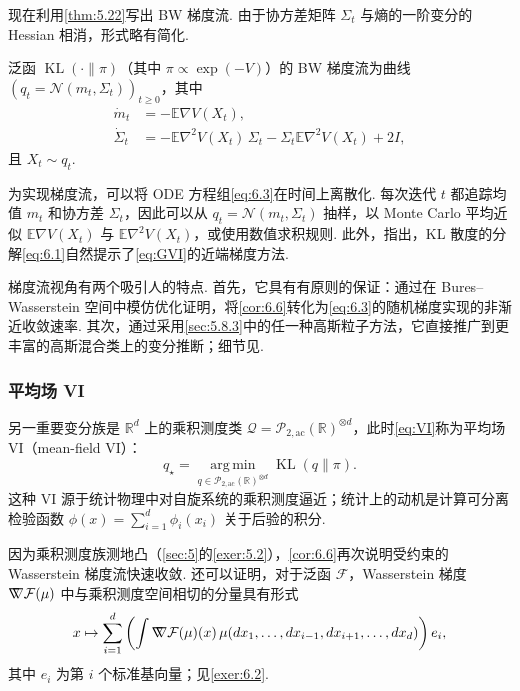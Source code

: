 现在利用\autoref{thm:5.22}写出 BW 梯度流. 由于协方差矩阵 $\Sigma_t$ 与熵的一阶变分的 Hessian 相消，形式略有简化.

\begin{theorem}\label{thm:6.8}
泛函 $\operatorname{KL}(\cdot\|\pi)$（其中 $\pi\propto\exp(-V)$）的 BW 梯度流为曲线 $(q_t=\mathcal N(m_t,\Sigma_t))_{t\geq0}$，其中
\begin{equation}\label{eq:6.3}
\begin{aligned}
\dot m_t&=-\mathbb E\nabla V(X_t),\\
\dot\Sigma_t&=-\mathbb E\nabla^2V(X_t)\,\Sigma_t
-\Sigma_t\mathbb E\nabla^2V(X_t)+2I,
\end{aligned}
\end{equation}
且 $X_t\sim q_t$.
\end{theorem}

为实现梯度流，可以将 ODE 方程组\eqref{eq:6.3}在时间上离散化. 每次迭代 $t$ 都追踪均值 $m_t$ 和协方差 $\Sigma_t$，因此可以从 $q_t=\mathcal N(m_t,\Sigma_t)$ 抽样，以 Monte Carlo 平均近似 $\mathbb E\nabla V(X_t)$ 与 $\mathbb E\nabla^2V(X_t)$，或使用数值求积规则. 此外，\cite{ref110}指出，KL 散度的分解\eqref{eq:6.1}自然提示了\eqref{eq:GVI}的近端梯度方法.

梯度流视角有两个吸引人的特点. 首先，它具有有原则的保证：通过在 Bures--Wasserstein 空间中模仿优化证明，\cite{ref110,ref192}将\autoref{cor:6.6}转化为\eqref{eq:6.3}的随机梯度实现的非渐近收敛速率. 其次，通过采用\autoref{sec:5.8.3}中的任一种高斯粒子方法，它直接推广到更丰富的高斯混合类上的变分推断；细节见\cite{ref192}.

\subsubsection{平均场 VI}\label{sec:6.1.3}

另一重要变分族是 $\mathbb R^d$ 上的乘积测度类 $\mathcal Q=\mathcal P_{2,\mathrm{ac}}(\mathbb R)^{\otimes d}$，此时\eqref{eq:VI}称为平均场 VI（mean-field VI）：
\begin{equation}\tag{MFVI}\label{eq:MFVI}
q_\star=\operatorname*{arg\,min}_{q\in\mathcal P_{2,\mathrm{ac}}(\mathbb R)^{\otimes d}}\operatorname{KL}(q\|\pi).
\end{equation}
这种 VI 源于统计物理中对自旋系统的乘积测度逼近；统计上的动机是计算可分离检验函数 $\phi(x)=\sum_{i=1}^d\phi_i(x_i)$ 关于后验的积分.

因为乘积测度族测地凸（\autoref{sec:5}的\autoref{exer:5.2}），\autoref{cor:6.6}再次说明受约束的 Wasserstein 梯度流快速收敛. 还可以证明，对于泛函 $\mathcal F$，Wasserstein 梯度 $\nabla\mkern-10mu\nabla\mathcal F(\mu)$ 中与乘积测度空间相切的分量具有形式
\begin{equation}\label{eq:6.4}
x\mapsto\sum_{i=1}^d\left(\int\nabla\mkern-10mu\nabla\mathcal F(\mu)(x)\,
\mu(dx_1,\ldots,dx_{i-1},dx_{i+1},\ldots,dx_d)\right)e_i,
\end{equation}
其中 $e_i$ 为第 $i$ 个标准基向量；见\autoref{exer:6.2}.

